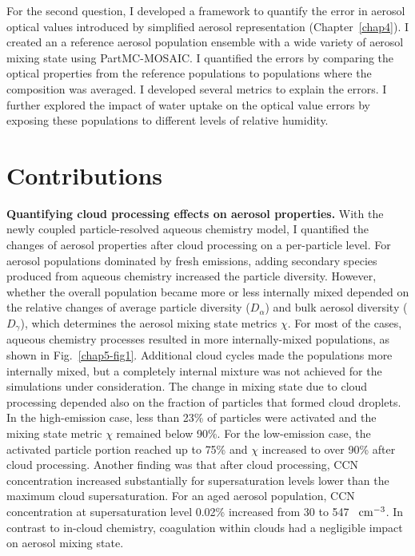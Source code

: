 \documentclass[edeposit,fullpage]{uiucthesis2009}
\makeatletter
\DeclareRobustCommand*\unit[1]
 {\ensuremath{%
   {\thinmuskip3mu\relax
    \def\mu{\text{\textmu}}\def~{\,}%
    \ifx\f@series\testbx\mathbf{#1}\else\mathrm{#1}\fi}}}
\makeatother
\begin{document}
For the second question, I developed a framework to quantify the error
in aerosol optical values introduced by simplified aerosol
representation (Chapter~\ref{chap4}). I created an a reference aerosol
population ensemble with a wide variety of aerosol mixing state using
PartMC-MOSAIC. I quantified the errors by comparing the optical
properties from the reference populations to populations where the
composition was averaged. I developed several metrics to explain the
errors. I further explored the impact of water uptake on the optical
value errors by exposing these populations to different levels of
relative humidity.

\section{Contributions}
{\bf Quantifying cloud processing effects on aerosol properties.} With
the newly coupled particle-resolved aqueous chemistry model, I
quantified the changes of aerosol properties after cloud processing on
a per-particle level. For aerosol populations dominated by fresh
emissions, adding secondary species produced from aqueous chemistry
increased the particle diversity. However, whether the overall
population became more or less internally mixed depended on the
relative changes of average particle diversity ($D_{\alpha}$) and bulk
aerosol diversity ($D_{\gamma}$), which determines the aerosol mixing
state metrics $\chi$. For most of the cases, aqueous chemistry
processes resulted in more internally-mixed populations, as shown in
Fig.~\ref{chap5-fig1}. Additional cloud cycles made the populations
more internally mixed, but a completely internal mixture was not
achieved for the simulations under consideration. The change in mixing
state due to cloud processing depended also on the fraction of
particles that formed cloud droplets. In the high-emission case, less
than 23\% of particles were activated and the mixing state metric
$\chi$ remained below 90\%. For the low-emission case, the activated
particle portion reached up to 75\% and $\chi$ increased to over 90\%
after cloud processing. Another finding was that after cloud
processing, CCN concentration increased substantially for
supersaturation levels lower than the maximum cloud
supersaturation. For an aged aerosol population, CCN concentration at
supersaturation level 0.02\% increased from 30 to 547
~\unit{cm^{-3}}. In contrast to in-cloud chemistry, coagulation within
clouds had a negligible impact on aerosol mixing state.
\end{document}

